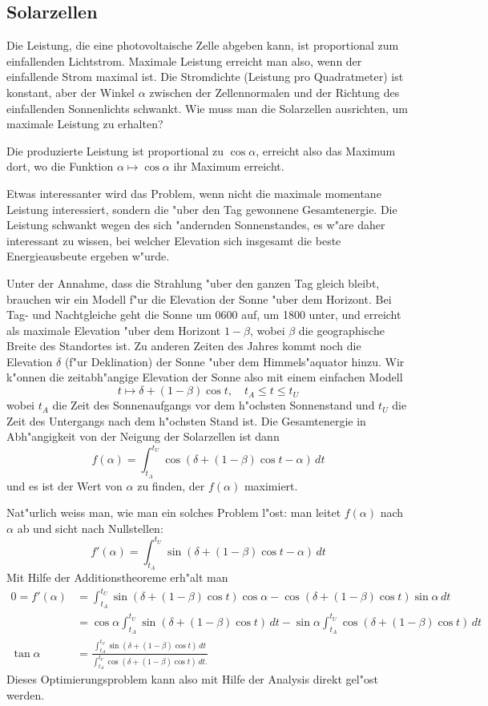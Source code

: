 \subsection{Solarzellen\label{uebersicht:solarzellen}}
Die Leistung, die eine photovoltaische Zelle abgeben kann, ist proportional
zum einfallenden Lichtstrom. Maximale Leistung erreicht man also,
wenn der einfallende Strom maximal ist. Die Stromdichte (Leistung 
pro Quadratmeter) ist konstant, aber der Winkel $\alpha$ zwischen der
Zellennormalen und der Richtung des einfallenden Sonnenlichts schwankt.
Wie muss man die Solarzellen ausrichten, um maximale Leistung zu erhalten?

Die produzierte Leistung ist proportional zu $\cos\alpha$, erreicht also
das Maximum dort, wo die Funktion $\alpha\mapsto\cos\alpha$ ihr
Maximum erreicht.

Etwas interessanter wird das Problem, wenn nicht die maximale momentane
Leistung interessiert, sondern die "uber den Tag gewonnene Gesamtenergie.
Die Leistung schwankt wegen des sich "andernden Sonnenstandes, es w"are
daher interessant zu wissen, bei welcher Elevation sich insgesamt
die beste Energieausbeute ergeben w"urde.

Unter der Annahme, dass die Strahlung "uber den ganzen Tag gleich bleibt,
brauchen wir ein Modell f"ur die Elevation der Sonne "uber dem Horizont.
Bei Tag- und Nachtgleiche geht die Sonne um 0600 auf, um 1800 unter,
und erreicht als maximale Elevation "uber dem Horizont $1-\beta$,
wobei $\beta$ die geographische Breite des Standortes ist.
Zu anderen Zeiten des Jahres kommt noch die Elevation $\delta$
(f"ur Deklination) der Sonne "uber dem Himmels"aquator hinzu.
Wir k"onnen die zeitabh"angige Elevation der Sonne also mit einem
einfachen Modell
\[
t\mapsto \delta + (1-\beta)\cos t,\quad t_A\le t\le t_U
\]
wobei $t_A$ die Zeit des Sonnenaufgangs vor dem h"ochsten Sonnenstand
und $t_U$ die Zeit des Untergangs nach dem h"ochsten Stand ist.
Die Gesamtenergie in Abh"angigkeit von der Neigung der
Solarzellen ist dann
\[
f(\alpha)=
\int_{t_A}^{t_U} \cos (\delta+(1-\beta)\cos t - \alpha)\,dt
\]
und es ist der Wert von $\alpha$ zu finden, der $f(\alpha)$
maximiert.

Nat"urlich weiss man, wie man ein solches Problem l"ost: man leitet
$f(\alpha)$ nach $\alpha$ ab und sicht nach Nullstellen:
\[
f'(\alpha)=\int_{t_A}^{t_U}
\sin(\delta + (1-\beta)\cos t-\alpha)
\,dt
\]
Mit Hilfe der Additionstheoreme erh"alt man
\begin{align*}
0=
f'(\alpha)
&=
\int_{t_A}^{t_U}
\sin(\delta + (1-\beta)\cos t)\cos\alpha
-
\cos(\delta + (1-\beta)\cos t)\sin\alpha
\,dt
\\
&=
\cos\alpha
\int_{t_A}^{t_U}
\sin(\delta + (1-\beta)\cos t)\,dt
-
\sin\alpha
\int_{t_A}^{t_U}
\cos(\delta + (1-\beta)\cos t)
\,dt
\\
\tan\alpha
&=
\frac{
\int_{t_A}^{t_U}
\sin(\delta + (1-\beta)\cos t)\,dt
}{
\int_{t_A}^{t_U}
\cos(\delta + (1-\beta)\cos t)\,dt.
}
\end{align*}
Dieses Optimierungsproblem kann also mit Hilfe der Analysis direkt
gel"ost werden.

